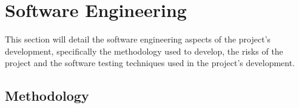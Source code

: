 \documentclass[12pt]{article}
\begin{document}


    \pagebreak


    \section{Software Engineering}\label{sec:software-engineering}

    \tab
    This section will detail the software engineering aspects of the project's development, specifically the
    methodology used to develop, the risks of the project and the software testing techniques used in the project's
    development.


    \subsection{Methodology}\label{subsec:methodology}

\end{document}
